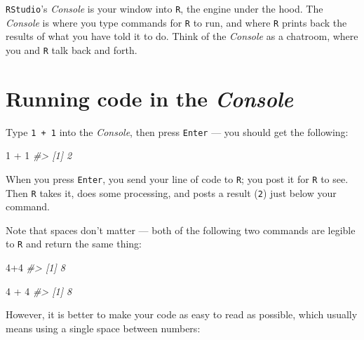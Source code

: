 \documentclass[
]{book}
\newenvironment{Shaded}{\begin{snugshade}}{\end{snugshade}}
\newcommand{\CommentTok}[1]{\textcolor[rgb]{0.56,0.35,0.01}{\textit{#1}}}
\newcommand{\DecValTok}[1]{\textcolor[rgb]{0.00,0.00,0.81}{#1}}
\newcommand{\SpecialCharTok}[1]{\textcolor[rgb]{0.00,0.00,0.00}{#1}}
\begin{document}
\texttt{RStudio}'s \emph{Console} is your window into \texttt{R}, the engine under the hood. The \emph{Console} is where you type commands for \texttt{R} to run, and where \texttt{R} prints back the results of what you have told it to do. Think of the \emph{Console} as a chatroom, where you and \texttt{R} talk back and forth.

\hypertarget{running-code-in-the-console}{%
\section*{\texorpdfstring{Running code in the \emph{Console}}{Running code in the Console}}\label{running-code-in-the-console}}

Type \texttt{1\ +\ 1} into the \emph{Console}, then press \texttt{Enter} --- you should get the following:

\begin{Shaded}
\begin{Highlighting}[]
\DecValTok{1} \SpecialCharTok{+} \DecValTok{1}
\CommentTok{\#\textgreater{} [1] 2}
\end{Highlighting}
\end{Shaded}

When you press \texttt{Enter}, you send your line of code to \texttt{R}; you post it for \texttt{R} to see. Then \texttt{R} takes it, does some processing, and posts a result (\texttt{2}) just below your command.

Note that spaces don't matter --- both of the following two commands are legible to \texttt{R} and return the same thing:

\begin{Shaded}
\begin{Highlighting}[]
\DecValTok{4}\SpecialCharTok{+}\DecValTok{4}
\CommentTok{\#\textgreater{} [1] 8}
\end{Highlighting}
\end{Shaded}

\begin{Shaded}
\begin{Highlighting}[]
\DecValTok{4}        \SpecialCharTok{+}        \DecValTok{4}
\CommentTok{\#\textgreater{} [1] 8}
\end{Highlighting}
\end{Shaded}

However, it is better to make your code as easy to read as possible, which usually means using a single space between numbers:
\end{document}
